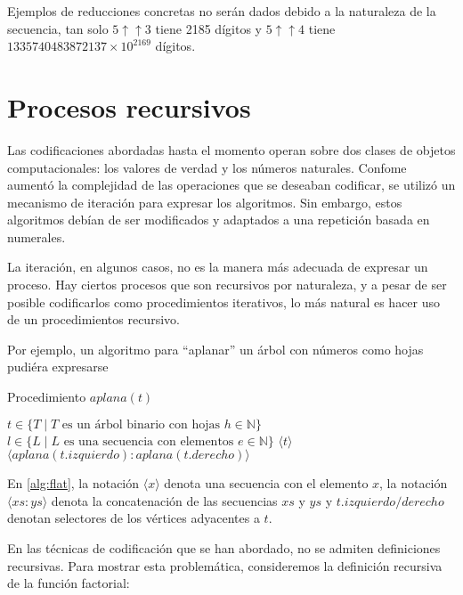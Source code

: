 Ejemplos de reducciones concretas no serán dados debido a la naturaleza de la secuencia, tan solo \( 5 \mathbin{\uparrow\uparrow} 3 \) tiene 2185 dígitos y \( 5 \mathbin{\uparrow\uparrow} 4 \) tiene \( 1335740483872137\times 10^{2169} \) dígitos.

\section{Procesos recursivos}
\label{sec:procesos-recursivos}

Las codificaciones abordadas hasta el momento operan sobre dos clases de objetos computacionales: los valores de verdad y los números naturales. Confome aumentó la complejidad de las operaciones que se deseaban codificar, se utilizó un mecanismo de iteración para expresar los algoritmos. Sin embargo, estos algoritmos debían de ser modificados y adaptados a una repetición basada en numerales.

La iteración, en algunos casos, no es la manera más adecuada de expresar un proceso. Hay ciertos procesos que son recursivos por naturaleza, y a pesar de ser posible codificarlos como procedimientos iterativos, lo más natural es hacer uso de un procedimientos recursivo.

Por ejemplo, un algoritmo para ``aplanar'' un árbol con números como hojas pudiéra expresarse

\begin{algorithm}
  \caption{Procedimiento \( aplana(t) \)}
  \label{alg:flat}
  \begin{algorithmic}
    \REQUIRE \( t \in \{ T \mid T \text{ es un árbol binario con hojas } h\in \mathbb{N} \} \)
    \ENSURE \( l \in \{ L \mid L \text{ es una secuencia con elementos } e\in \mathbb{N} \} \)
    \RETURN \( \langle t \rangle \)
    \ELSE
    \RETURN \( \langle aplana(t.izquierdo) \colon  aplana(t.derecho) \rangle \)
    \ENDIF
  \end{algorithmic}
\end{algorithm}

En \ref{alg:flat}, la notación \( \langle x \rangle \) denota una secuencia con el elemento \( x \), la notación \( \langle xs : ys \rangle \) denota la concatenación de las secuencias \( xs \) y \( ys \) y \( t.izquierdo/derecho \) denotan selectores de los vértices adyacentes a \( t \).

En las técnicas de codificación que se han abordado, no se admiten definiciones recursivas. Para mostrar esta problemática, consideremos la definición recursiva de la función factorial:

